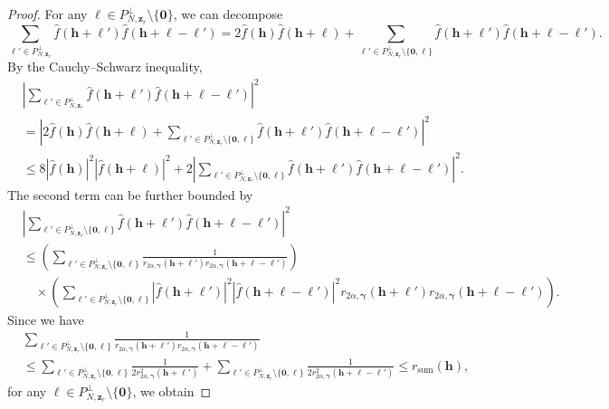 \documentclass[a4paper,11pt]{article}
\newcommand{\bszero}{\boldsymbol{0}}
\newcommand{\bsh}{\boldsymbol{h}}
\newcommand{\bsl}{\boldsymbol{\ell}}
\newcommand{\bsgamma}{\boldsymbol{\gamma}}
\newcommand{\abs}[1]{\left\vert#1\right\vert}
\begin{document}
\begin{proof}
    For any $\bsl \in P_{N,\boldsymbol{z}_r}^\perp\setminus \{\bszero\}$, we can decompose
    \[ 
    \sum_{\bsl'\in P_{N,\boldsymbol{z}_r}^\perp}\widehat{f}(\bsh+\bsl')\widehat{f}(\bsh+\bsl-\bsl')=2\widehat{f}(\bsh)\widehat{f}(\bsh+\bsl)+\sum_{\bsl'\in P_{N,\boldsymbol{z}_r}^\perp\setminus\{\bszero,\bsl\} }\widehat{f}(\bsh+\bsl')\widehat{f}(\bsh+\bsl-\bsl').
    \]
    By the Cauchy--Schwarz inequality,
    \begin{align}\label{eqn:fhfhl}
       & \abs{\sum_{\bsl'\in P_{N,\boldsymbol{z}_r}^\perp}\widehat{f}(\bsh+\bsl')\widehat{f}(\bsh+\bsl-\bsl')}^2 \nonumber \\
       & = \abs{2\widehat{f}(\bsh)\widehat{f}(\bsh+\bsl)+\sum_{\bsl'\in P_{N,\boldsymbol{z}_r}^\perp\setminus\{\bszero,\bsl\} }\widehat{f}(\bsh+\bsl')\widehat{f}(\bsh+\bsl-\bsl')}^2\nonumber  \\
       & \leq 8|\widehat{f}(\bsh)|^2|\widehat{f}(\bsh+\bsl)|^2+2\abs{\sum_{\bsl'\in P_{N,\boldsymbol{z}_r}^\perp\setminus\{\bszero,\bsl\} }\widehat{f}(\bsh+\bsl')\widehat{f}(\bsh+\bsl-\bsl')}^2.
    \end{align}
    The second term can be further bounded by
    \begin{align*}
        & \abs{\sum_{\bsl'\in P_{N,\boldsymbol{z}_r}^\perp\setminus\{\bszero,\bsl\} }\widehat{f}(\bsh+\bsl')\widehat{f}(\bsh+\bsl-\bsl')}^2 \\
        & \leq \left(\sum_{\bsl'\in P_{N,\boldsymbol{z}_r}^\perp\setminus\{\bszero,\bsl\} }\frac{1}{r_{2\alpha, \bsgamma}(\bsh+\bsl')r_{2\alpha, \bsgamma}(\bsh+\bsl-\bsl')}\right) \\
        & \quad \times  \left(\sum_{\bsl'\in P_{N,\boldsymbol{z}_r}^\perp\setminus\{\bszero,\bsl\} }|\widehat{f}(\bsh+\bsl')|^2|\widehat{f}(\bsh+\bsl-\bsl')|^2r_{2\alpha, \bsgamma}(\bsh+\bsl')r_{2\alpha, \bsgamma}(\bsh+\bsl-\bsl')\right).
    \end{align*}
    Since we have 
    \begin{align*}
        &\sum_{\bsl'\in P_{N,\boldsymbol{z}_r}^\perp\setminus\{\bszero,\bsl\} }\frac{1}{r_{2\alpha, \bsgamma}(\bsh+\bsl')r_{2\alpha, \bsgamma}(\bsh+\bsl-\bsl')} \\
    & \leq \sum_{\bsl'\in P_{N,\boldsymbol{z}_r}^\perp\setminus\{\bszero,\bsl\} }\frac{1}{2r^2_{2\alpha, \bsgamma}(\bsh+\bsl')}+\sum_{\bsl'\in P_{N,\boldsymbol{z}_r}^\perp\setminus\{\bszero,\bsl\} }\frac{1}{2r^2_{2\alpha, \bsgamma}(\bsh+\bsl-\bsl')} \leq r_{\mathrm{sum}}(\bsh),
    \end{align*}
    for any $\bsl \in P_{N,\boldsymbol{z}_r}^\perp\setminus \{\bszero\}$, we obtain

\end{proof}
\end{document}
